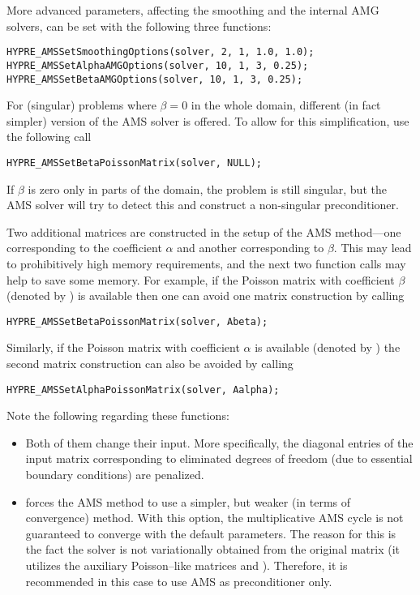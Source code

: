More advanced parameters, affecting the smoothing and the
internal AMG solvers, can be set with the following three
functions:
\begin{display}\begin{verbatim}
HYPRE_AMSSetSmoothingOptions(solver, 2, 1, 1.0, 1.0);
HYPRE_AMSSetAlphaAMGOptions(solver, 10, 1, 3, 0.25);
HYPRE_AMSSetBetaAMGOptions(solver, 10, 1, 3, 0.25);
\end{verbatim}\end{display}

For (singular) problems where $\beta = 0$ in the whole domain,
different (in fact simpler) version of the AMS solver is offered.
To allow for this simplification, use the following \hypre{} call
\begin{display}\begin{verbatim}
HYPRE_AMSSetBetaPoissonMatrix(solver, NULL);
\end{verbatim}\end{display}
If $\beta$ is zero only in parts of the domain, the problem is still
singular, but the AMS solver will try to detect this and construct
a non-singular preconditioner.

Two additional matrices are constructed in the setup of the
AMS method---one corresponding to the coefficient $\alpha$
and another corresponding to $\beta$.
This may  lead to prohibitively high memory requirements, and
the next two function calls may help to save some memory.
For example, if the Poisson matrix with coefficient $\beta$
(denoted by ) is
available then one can avoid one matrix construction by calling
\begin{display}\begin{verbatim}
HYPRE_AMSSetBetaPoissonMatrix(solver, Abeta);
\end{verbatim}\end{display}
Similarly, if the Poisson matrix with coefficient $\alpha$ is available
(denoted by )
the second matrix construction can also be avoided by calling
\begin{display}\begin{verbatim}
HYPRE_AMSSetAlphaPoissonMatrix(solver, Aalpha);
\end{verbatim}\end{display}
Note the following regarding these functions:
\begin{itemize}
\item Both of them change their input. More specifically,
the diagonal entries of the input matrix corresponding to eliminated
degrees of freedom (due to essential boundary conditions)
are penalized.
\item {} forces the
AMS method to use a simpler, but weaker (in terms of convergence) method.
With this option, the multiplicative AMS cycle
is not guaranteed to converge with the
default parameters. The reason for this is the fact the solver is not
variationally obtained from the original matrix (it utilizes
the auxiliary Poisson--like matrices  and ).
Therefore, it is recommended in this case to use AMS as preconditioner
only.
\end{itemize}

